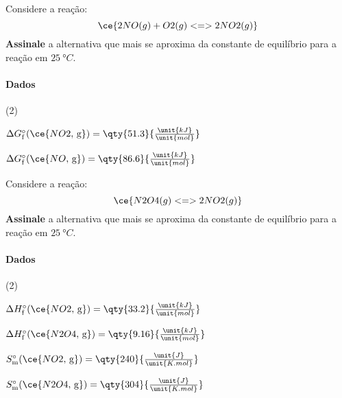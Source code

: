 \begin{problem}[
	id={2F11},
	path={/home/braun/Documents/Developer/braunchem/data/problems/Q2/2F/2F11}
]
Considere a reação: {\[
    \ce{ 2 NO(g) + O2(g) <=> 2 NO2(g) }
\]} \textbf{Assinale} a alternativa que mais se aproxima da constante de equilíbrio para a reação em {\(\qty{25}{\unit{\degree C}}\)}.
\paragraph{Dados}\small 
\begin{datalist}
[start = 1](2)\item $\Delta G_\mathrm{f}^{\circ}(\ce{NO2,\,\text{g}}) = \qty{51.3}{\tfrac{\unit{kJ}}{\unit{mol}}}$
\item $\Delta G_\mathrm{f}^{\circ}(\ce{NO,\,\text{g}}) = \qty{86.6}{\tfrac{\unit{kJ}}{\unit{mol}}}$
\end{datalist}

\end{problem}


\begin{problem}[
	id={2F12},
	path={/home/braun/Documents/Developer/braunchem/data/problems/Q2/2F/2F12}
]
Considere a reação: {\[
    \ce{ N2O4(g) <=> 2 NO2(g) }
\]} \textbf{Assinale} a alternativa que mais se aproxima da constante de equilíbrio para a reação em {\(\qty{25}{\unit{\degree C}}\)}.
\paragraph{Dados}\small 
\begin{datalist}
[start = 1](2)\item $\Delta H_\mathrm{f}^{\circ}(\ce{NO2,\,\text{g}}) = \qty{33.2}{\tfrac{\unit{kJ}}{\unit{mol}}}$
\item $\Delta H_\mathrm{f}^{\circ}(\ce{N2O4,\,\text{g}}) = \qty{9.16}{\tfrac{\unit{kJ}}{\unit{mol}}}$
\item $S_\mathrm{m}^{\circ}(\ce{NO2,\,\text{g}}) = \qty{240}{\tfrac{\unit{J}}{\unit{K.mol}}}$
\item $S_\mathrm{m}^{\circ}(\ce{N2O4,\,\text{g}}) = \qty{304}{\tfrac{\unit{J}}{\unit{K.mol}}}$
\end{datalist}

\end{problem}



